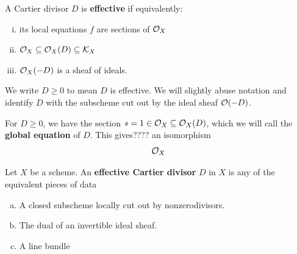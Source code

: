 \documentclass[12pt]{article}
\begin{document}

\begin{defn}
    A Cartier divisor $D$ is \textbf{effective} if equivalently:
    \begin{enumerate}[(i)]
        \item its local equations $f$ are sections of $\mathcal{O}_X$
        \item $\mathcal{O}_X \subseteq \mathcal{O}_X(D) \subseteq \mathcal{K}_X$
        \item $\mathcal{O}_X(-D)$ is a sheaf of ideals.
    \end{enumerate}
    We write $D\geq 0$ to mean $D$ is effective. We will slightly abuse notation and identify $D$ with the subscheme cut out by the ideal sheaf $\mathcal{O}(-D)$.

    For $D\geq 0$, we have the section $s=1\in \mathcal{O}_X \subseteq \mathcal{O}_X(D)$, which we will call the \textbf{global equation} of $D$. This gives???? an isomorphism
    \[\mathcal{O}_X \]
\end{defn}



\begin{defn}
    Let $X$ be a scheme. An \textbf{effective Cartier divisor} $D$ in $X$ is any of the equivalent pieces of data
    \begin{enumerate}[(a)]
        \item A closed subscheme locally cut out by nonzerodivisors.
        \item The dual of an invertible ideal sheaf.
        \item A line bundle 
    \end{enumerate}
\end{defn}
\end{document}
